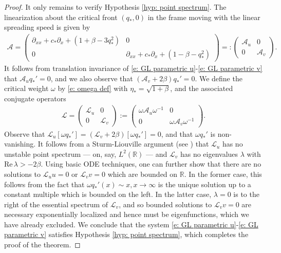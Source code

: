 \documentclass[11pt]{article}
\newcommand{\R}{\mathbb{R}}
\newcommand{\mcl}{\mathcal{L}}
\renewcommand{\Re}{\mathrm{Re} \,}
\numberwithin{equation}{section}
\numberwithin{prop}{section}
\begin{document}
\begin{proof}
	It only remains to verify Hypothesis \ref{hyp: point spectrum}. The linearization about the critical front $(q_*, 0)$ in the frame moving with the linear spreading speed is given by
	\begin{align}
	\mathcal{A} = \begin{pmatrix}
	\partial_{xx} + c_* \partial_x + (1+ \beta - 3 q_*^2) & 0 \\
	0 & \partial_{xx}+ c_* \partial_x + (1 - \beta - q_*^2) 
	\end{pmatrix} =: \begin{pmatrix}
	\mathcal{A}_u & 0 \\ 0 & \mathcal{A}_v
	\end{pmatrix}. 
	\end{align}
	It follows from translation invariance of \eqref{e: GL parametric u}-\eqref{e: GL parametric v} that $\mathcal{A}_u q_*' = 0$, and we also observe that $(\mathcal{A}_v+2 \beta) q_*' = 0$. We define the critical weight $\omega$ by \eqref{e: omega def} with $\eta_* = \sqrt{1+\beta}$, and the associated conjugate operators
	\begin{align}
	\mcl = \begin{pmatrix}
	\mcl_u & 0 \\ 0 & \mcl_v
	\end{pmatrix} := 
	\begin{pmatrix}
	\omega \mathcal{A}_u \omega^{-1} & 0 \\
	0 & \omega \mathcal{A}_v \omega^{-1}
	\end{pmatrix}. 
	\end{align}
	Observe that $\mcl_u [\omega q_*'] = (\mcl_v + 2 \beta) [\omega q_*'] = 0$, and that $\omega q_*'$ is non-vanishing. It follows from a Sturm-Liouville argument (see \cite[Theorem 5.5]{Sattinger}) that $\mcl_u$ has no unstable point spectrum --- on, say, $L^2 (\R)$ --- and $\mcl_v$ has no eigenvalues $\lambda$ with $\Re \lambda > - 2 \beta$. Using basic ODE techniques, one can further show that there are no solutions to $\mcl_u u = 0$ or $\mcl_v v = 0$ which are bounded on $\R$. In the former case, this follows from the fact that $\omega q_*' (x) \sim x, x \to \infty$ is the unique solution up to a constant multiple which is bounded on the left. In the latter case, $\lambda = 0$ is to the right of the essential spectrum of $\mcl_v$, and so bounded solutions to $\mcl_v v  = 0$ are necessary exponentially localized and hence must be eigenfunctions, which we have already excluded. We conclude that the system \eqref{e: GL parametric u}-\eqref{e: GL parametric v} satisfies Hypothesis \ref{hyp: point spectrum}, which completes the proof of the theorem. 
\end{proof}
\end{document}
